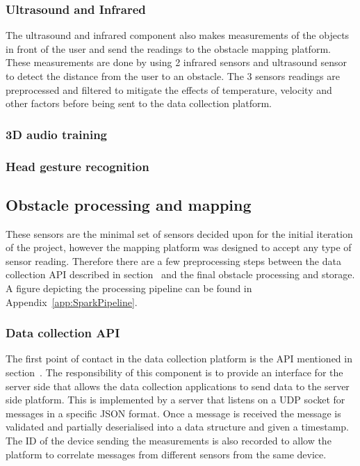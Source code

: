 \documentclass[prodmode,acmtosem]{acmsmall} %
\begin{document}
\subsubsection{Ultrasound and Infrared}
The ultrasound and infrared component also makes measurements of the objects in front of the user and send the readings to the obstacle mapping platform.
These measurements are done by using 2 infrared sensors and ultrasound sensor to detect the distance from the user to an obstacle. The 3 sensors readings are preprocessed and filtered to mitigate the effects of temperature, velocity and other factors before being sent to the data collection platform. 

\subsubsection{3D audio training}

\subsubsection{Head gesture recognition}

\subsection{Obstacle processing and mapping}
These sensors are the minimal set of sensors decided upon for the initial iteration of the project, however the mapping platform was designed to accept any type of sensor reading. Therefore there are a few preprocessing steps between the data collection API described in section~\cite{sec:interactions} and the final obstacle processing and storage. A figure depicting the processing pipeline can be found in Appendix~\ref{app:SparkPipeline}.

\subsubsection{Data collection API}
The first point of contact in the data collection platform is the API mentioned in section~\cite{sec:interactions}. The responsibility of this component is to provide an interface for the server side that allows the data collection applications to send data to the server side platform. This is implemented by a server that listens on a UDP socket for messages in a specific JSON format. Once a message is received the message is validated and partially deserialised into a data structure and given a timestamp. The ID of the device sending the measurements is also recorded to allow the platform to correlate messages from different sensors from the same device.
\end{document}
